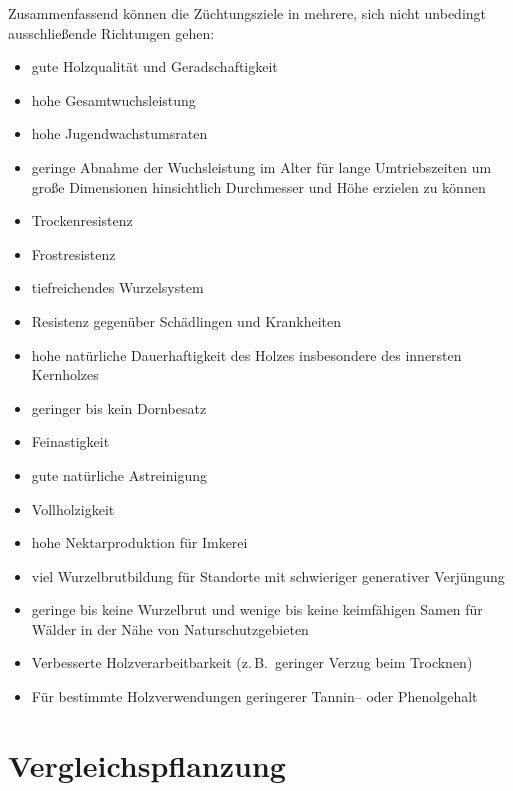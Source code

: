 \documentclass[twocolumn]{scrartcl}
\begin{document}
Zusammenfassend können die Züchtungsziele in mehrere, sich nicht unbedingt
ausschließende Richtungen gehen:

\begin{itemize}
  \item gute Holzqualität und Geradschaftigkeit
  \item hohe Gesamtwuchsleistung
  \item hohe Jugendwachstumsraten
  \item geringe Abnahme der Wuchsleistung im Alter für lange Umtriebszeiten um große Dimensionen hinsichtlich Durchmesser und Höhe erzielen zu können
  \item Trockenresistenz
  \item Frostresistenz
  \item tiefreichendes Wurzelsystem
  \item Resistenz gegenüber Schädlingen und Krankheiten
  \item hohe natürliche Dauerhaftigkeit des Holzes insbesondere des innersten Kernholzes
  \item geringer bis kein Dornbesatz
  \item Feinastigkeit
  \item gute natürliche Astreinigung
  \item Vollholzigkeit
  \item hohe Nektarproduktion für Imkerei
  \item viel Wurzelbrutbildung für Standorte mit schwieriger generativer Verjüngung
  \item geringe bis keine Wurzelbrut und wenige bis keine keimfähigen Samen für Wälder in der Nähe von Naturschutzgebieten
  \item Verbesserte Holzverarbeitbarkeit (z.\,B.\ geringer Verzug beim Trocknen)
  \item Für bestimmte Holzverwendungen geringerer Tannin-- oder Phenolgehalt 
\end{itemize}

\section{Vergleichspflanzung}
\end{document}
